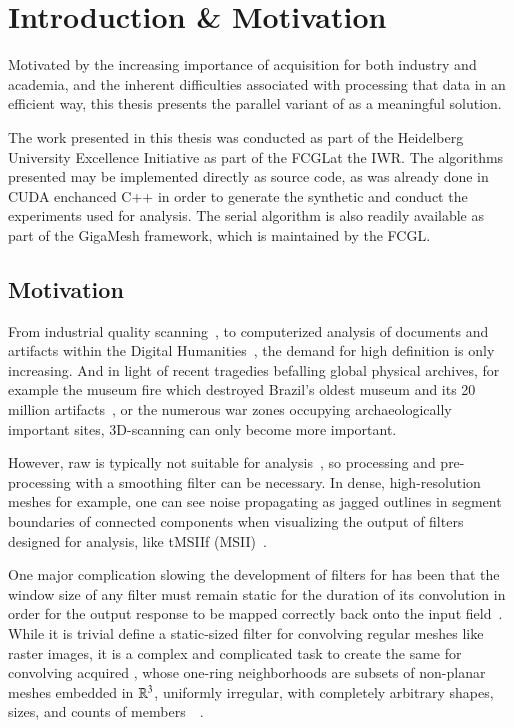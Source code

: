 \chapter{Introduction \& Motivation}
\label{ch1}
Motivated by the increasing importance of \tdd{} acquisition for both industry and academia, and the inherent difficulties associated with processing that data in an efficient way, this thesis presents the parallel variant of  as a meaningful solution.

The work presented in this thesis was conducted as part of the Heidelberg University Excellence Initiative as part of the \gls{FCGL}at the \gls{IWR}. The algorithms presented may be implemented directly as source code, as was already done in CUDA enchanced C++ in order to generate the synthetic \tdd{} and conduct the experiments used for analysis. The serial algorithm is also readily available as part of the GigaMesh framework, which is maintained by the \gls{FCGL}.

%
%
%
%
%
%
\section{Motivation}
From industrial quality scanning~\cite{ILATO14}, to computerized analysis of documents and artifacts within the Digital Humanities~\cite{Bogacz15}, the demand for high definition \tdd{} is only increasing. And in light of recent tragedies befalling global physical archives, for example the museum fire which destroyed Brazil's oldest museum and its 20 million artifacts~\cite{Andreoni18}, or the numerous war zones occupying archaeologically important sites, 3D-scanning can only become more important.

However, raw \tdd{} is typically not suitable for analysis~\cite[p.~25-32]{Mara12}, so processing and pre-processing with a smoothing filter can be necessary. In dense, high-resolution meshes for example, one can see noise propagating as jagged outlines in segment boundaries of connected components when visualizing the output of filters designed for analysis, like \acrlong{tMSIIf} (MSII)~\cite[s.~3.2]{Mara17}.

One major complication slowing the development of filters for \tdd{} has been that the window size of any filter must remain static for the duration of its convolution in order for the output response to be mapped correctly back onto the input field~\cite[p.~106-112]{Jaehne97}. While it is trivial define a static-sized filter for convolving regular meshes like raster images, it is a complex and complicated task to create the same for convolving acquired \tdd{}, whose one-ring neighborhoods are subsets of non-planar meshes embedded in $\mathbb{R}^{3}$, uniformly irregular, with completely arbitrary shapes, sizes, and counts of members~\cite[p.~29]{Mara12}~\cite[s.~3.2]{Mara17}.

